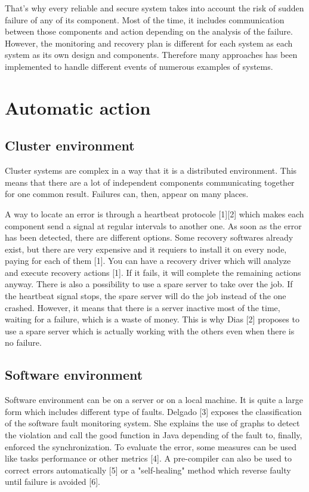 \documentclass[10pt,a4paper]{report}
\begin{document}
That's why every reliable and secure system takes into account the risk of sudden failure of any of its component. Most of the time, it includes communication between those components and action depending on the analysis of the failure. However, the monitoring and recovery plan is different for each system as each system as its own design and components. Therefore many approaches has been implemented to handle different events of numerous examples of systems. 

	\section{Automatic action}
		\subsection{Cluster environment}
Cluster systems are complex in a way that it is a distributed environment. This means that there are a lot of independent components communicating together for one common result. Failures can, then, appear on many places. 

A way to locate an error is through a heartbeat protocole [1][2] which makes each component send a signal at regular intervals to another one. As soon as the error has been detected, there are different options. 
Some recovery softwares already exist, but there are very expensive and it requiers to install it on every node, paying for each of them [1].
You can have a recovery driver which will analyze and execute recovery actions [1]. If it fails, it will complete the remaining actions anyway. 
There is also a possibility to use a spare server to take over the job. If the heartbeat signal stops, the spare server will do the job instead of the one crashed. However, it means that there is a server inactive most of the time, waiting for a failure, which is a waste of money. This is why Dias [2] proposes to use a spare server which is actually working with the others even when there is no failure.

		\subsection{Software environment}
Software environment can be on a server or on a local machine. It is quite a large form which includes different type of faults. Delgado [3] exposes the classification of the software fault monitoring system. She explains the use of graphs to detect the violation and call the good function in Java depending of the fault to, finally, enforced the synchronization. To evaluate the error, some measures can be used like tasks performance or other metrics [4]. A pre-compiler can also be used to correct errors automatically [5] or a "self-healing" method which reverse faulty until failure is avoided [6].
		
\end{document}
